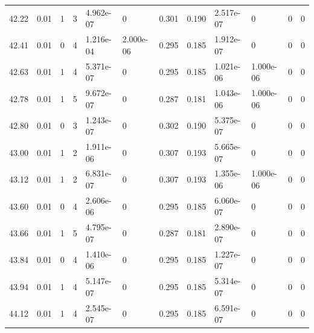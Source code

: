 \documentclass[preview]{standalone}
\begin{document}
{{{\begin{tabular}{L{1.2cm}C{1.2cm} C{0.3cm}C{0.5cm} C{1.4cm}C{1.4cm} C{1.4cm}C{1.4cm} C{1.6cm}C{1.6cm} C{1.6cm}C{1.6cm}}
  42.22  &  0.01  & 1     &  3 &  4.962e-07  & 0  &  0.301&   0.190& 2.517e-07 & 0   &  0 & 0  \\ 
  42.41  &  0.01  & 0     &  4 &  1.216e-04  & 2.000e-06  &  0.295&   0.185& 1.912e-07 & 0   &  0 & 0  \\ 
  42.63  &  0.01  & 1     &  4 &  5.371e-07  & 0  &  0.295&   0.185& 1.021e-06 & 1.000e-06   &  0 & 0  \\ 
  42.78  &  0.01  & 1     &  5 &  9.672e-07  & 0  &  0.287&   0.181& 1.043e-06 & 1.000e-06   &  0 & 0  \\ 
  42.80  &  0.01  & 0     &  3 &  1.243e-07  & 0  &  0.302&   0.190& 5.375e-07 & 0   &  0 & 0  \\ 
  43.00  &  0.01  & 1     &  2 &  1.911e-06  & 0  &  0.307&   0.193& 5.665e-07 & 0   &  0 & 0  \\ 
  43.12  &  0.01  & 1     &  2 &  6.831e-07  & 0  &  0.307&   0.193& 1.355e-06 & 1.000e-06   &  0 & 0  \\ 
  43.60  &  0.01  & 0     &  4 &  2.606e-06  & 0  &  0.295&   0.185& 6.060e-07 & 0   &  0 & 0  \\ 
  43.66  &  0.01  & 1     &  5 &  4.795e-07  & 0  &  0.287&   0.181& 2.890e-07 & 0   &  0 & 0  \\ 
  43.84  &  0.01  & 0     &  4 &  1.410e-06  & 0  &  0.295&   0.185& 1.227e-07 & 0   &  0 & 0  \\ 
  43.94  &  0.01  & 1     &  4 &  5.147e-07  & 0  &  0.295&   0.185& 5.314e-07 & 0   &  0 & 0  \\ 
  44.12  &  0.01  & 1     &  4 &  2.545e-07  & 0  &  0.295&   0.185& 6.591e-07 & 0   &  0 & 0  \\ 
\hline 
\end{tabular} 

}}}
\end{document}
